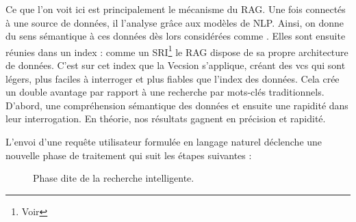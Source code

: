 \newpage

Ce que l'on voit ici est principalement le mécanisme du \gls{RAG}. Une fois connectés à une source de données, il l'analyse grâce aux modèles de \gls{NLP}. Ainsi, on donne du sens sémantique à ces données dès lors considérées comme . Elles sont ensuite réunies dans un index : comme un \gls{SRI}\footnote{Voir } le \gls{RAG} dispose de sa propre architecture de données. C'est sur cet index que la \gls{Vecsion} s'applique, créant des \gls{vcs} qui sont légers, plus faciles à interroger et plus fiables que l'index des données. Cela crée un double avantage par rapport à une recherche par mots-clés traditionnels. D'abord, une compréhension sémantique des données et ensuite une rapidité dans leur interrogation. En théorie, nos résultats gagnent en précision et rapidité.\newline

L'envoi d'une requête utilisateur formulée en langage naturel déclenche une nouvelle phase de traitement qui suit les étapes suivantes : 


\begin{figure}[H]
\centering
{}
\caption{Phase dite  de la recherche intelligente.}
\end{figure}

